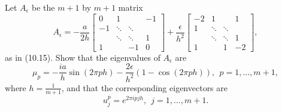 \documentclass[10pt]{article}
\begin{document}
\maketitle



\begin{problem}[Problem 1]
Let \(A_{\epsilon}\) be the \(m+1\) by \(m+1\) matrix
\[
A_{\epsilon} = - \frac{a}{2h} \left[ \begin{array}{cccc}
0 & 1 &        & -1 \\
-1 & \ddots & \ddots & \\
   & \ddots & \ddots & 1 \\
1  &        & -1     & 0 \end{array} \right] + \frac{\epsilon}{h^2} \left[ \begin{array}{cccc}
-2 & 1 & & 1 \\
1 & \ddots & \ddots & \\
  & \ddots & \ddots & 1 \\
1 &        & 1      & -2 \end{array} \right] ,
\]
as in (10.15).  Show that the eigenvalues of \(A_{\epsilon}\) are
\[
\mu_p = - \frac{ia}{h} \sin ( 2 \pi p h ) - \frac{2 \epsilon}{h^2} ( 1 - \cos ( 2 \pi p h )) ,
~~p=1, \ldots ,m+1 ,
\]
where \(h = \frac{1}{m+1}\), and that the corresponding eigenvectors are
\[
u_j^p = e^{2 \pi i p j h} ,~~j=1, \ldots , m+1 .
\]
\end{problem}
\end{document}
